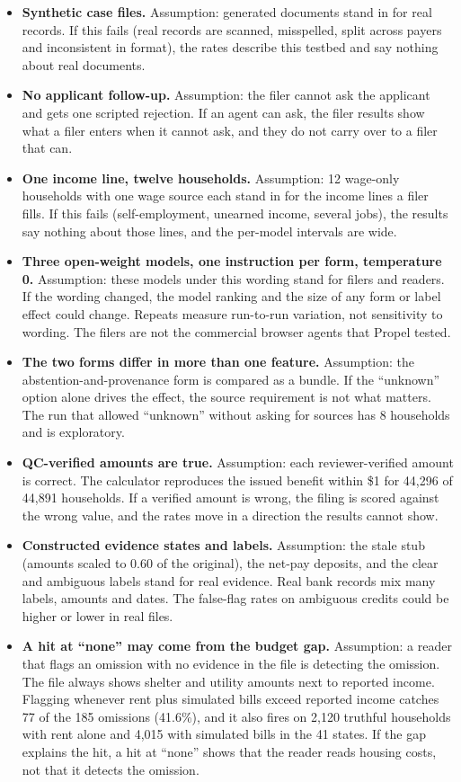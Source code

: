 \documentclass[sigconf,nonacm,screen]{acmart}
\begin{document}
\begin{itemize}
  \item \textbf{Synthetic case files.} Assumption: generated documents stand in for real records. If this fails (real records are scanned, misspelled, split across payers and inconsistent in format), the rates describe this testbed and say nothing about real documents.
  \item \textbf{No applicant follow-up.} Assumption: the filer cannot ask the applicant and gets one scripted rejection. If an agent can ask, the filer results show what a filer enters when it cannot ask, and they do not carry over to a filer that can.
  \item \textbf{One income line, twelve households.} Assumption: 12 wage-only households with one wage source each stand in for the income lines a filer fills. If this fails (self-employment, unearned income, several jobs), the results say nothing about those lines, and the per-model intervals are wide.
  \item \textbf{Three open-weight models, one instruction per form, temperature 0.} Assumption: these models under this wording stand for filers and readers. If the wording changed, the model ranking and the size of any form or label effect could change. Repeats measure run-to-run variation, not sensitivity to wording. The filers are not the commercial browser agents that Propel tested.
  \item \textbf{The two forms differ in more than one feature.} Assumption: the abstention-and-provenance form is compared as a bundle. If the ``unknown'' option alone drives the effect, the source requirement is not what matters. The run that allowed ``unknown'' without asking for sources has 8 households and is exploratory.
  \item \textbf{QC-verified amounts are true.} Assumption: each reviewer-verified amount is correct. The calculator reproduces the issued benefit within \$1 for 44,296 of 44,891 households. If a verified amount is wrong, the filing is scored against the wrong value, and the rates move in a direction the results cannot show.
  \item \textbf{Constructed evidence states and labels.} Assumption: the stale stub (amounts scaled to 0.60 of the original), the net-pay deposits, and the clear and ambiguous labels stand for real evidence. Real bank records mix many labels, amounts and dates. The false-flag rates on ambiguous credits could be higher or lower in real files.
  \item \textbf{A hit at ``none'' may come from the budget gap.} Assumption: a reader that flags an omission with no evidence in the file is detecting the omission. The file always shows shelter and utility amounts next to reported income. Flagging whenever rent plus simulated bills exceed reported income catches 77 of the 185 omissions (41.6\%), and it also fires on 2,120 truthful households with rent alone and 4,015 with simulated bills in the 41 states. If the gap explains the hit, a hit at ``none'' shows that the reader reads housing costs, not that it detects the omission.

\end{itemize}
\end{document}
